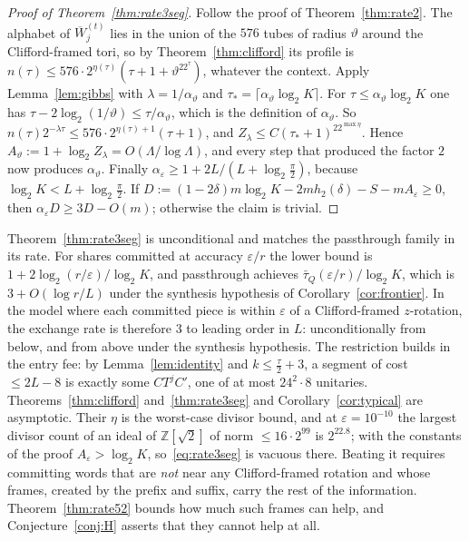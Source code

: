 \documentclass[aps,prx,twocolumn,superscriptaddress,nofootinbib,longbibliography]{revtex4-2}
\theoremstyle{plain}
\theoremstyle{definition}
\theoremstyle{remark}
\newcommand{\Z}{\mathbb{Z}}
\begin{document}
\begin{proof}[Proof of Theorem~\ref{thm:rate3seg}]
Follow the proof of Theorem~\ref{thm:rate2}. The alphabet of $\overline W^{(t)}_j$ lies in the union of the $576$ tubes of radius $\vartheta$ around the Clifford-framed tori, so by Theorem~\ref{thm:clifford} its profile is $n(\tau)\le576\cdot2^{\eta(\tau)}(\tau+1+\vartheta^22^\tau)$, whatever the context. Apply Lemma~\ref{lem:gibbs} with $\lambda=1/\alpha_\vartheta$ and $\tau_*=\lceil\alpha_\vartheta\log_2K\rceil$. For $\tau\le\alpha_\vartheta\log_2K$ one has $\tau-2\log_2(1/\vartheta)\le\tau/\alpha_\vartheta$, which is the definition of $\alpha_\vartheta$. So $n(\tau)2^{-\lambda\tau}\le576\cdot2^{\eta(\tau)+1}(\tau+1)$, and $Z_\lambda\le C(\tau_*+1)^22^{\max\eta}$. Hence $A_\vartheta:=1+\log_2Z_\lambda=O(\Lambda/\log\Lambda)$, and every step that produced the factor $2$ now produces $\alpha_\vartheta$. Finally $\alpha_\varepsilon\ge1+2L/(L+\log_2\frac\pi2)$, because $\log_2K<L+\log_2\frac\pi2$. If $D:=(1-2\delta)m\log_2K-2mh_2(\delta)-S-mA_\varepsilon\ge0$, then $\alpha_\varepsilon D\ge3D-O(m)$; otherwise the claim is trivial.
\end{proof}
Theorem~\ref{thm:rate3seg} is unconditional and matches the passthrough family in its rate. For shares committed at accuracy $\varepsilon/r$ the lower bound is $1+2\log_2(r/\varepsilon)/\log_2K$, and passthrough achieves $\bar\tau_Q(\varepsilon/r)/\log_2K$, which is $3+O(\log r/L)$ under the synthesis hypothesis of Corollary~\ref{cor:frontier}. In the model where each committed piece is within $\varepsilon$ of a Clifford-framed $z$-rotation, the exchange rate is therefore $3$ to leading order in $L$: unconditionally from below, and from above under the synthesis hypothesis. The restriction builds in the entry fee: by Lemma~\ref{lem:identity} and $k\le\tfrac\tau2+3$, a segment of cost $\le2L-8$ is exactly some $CT^jC'$, one of at most $24^2\cdot8$ unitaries. Theorems~\ref{thm:clifford} and~\ref{thm:rate3seg} and Corollary~\ref{cor:typical} are asymptotic. Their $\eta$ is the worst-case divisor bound, and at $\varepsilon=10^{-10}$ the largest divisor count of an ideal of $\Z[\sqrt2]$ of norm $\le16\cdot2^{99}$ is $2^{22.8}$; with the constants of the proof $A_\varepsilon>\log_2K$, so~\eqref{eq:rate3seg} is vacuous there. Beating it requires committing words that are \emph{not} near any Clifford-framed rotation and whose frames, created by the prefix and suffix, carry the rest of the information. Theorem~\ref{thm:rate52} bounds how much such frames can help, and Conjecture~\ref{conj:H} asserts that they cannot help at all.
\end{document}
